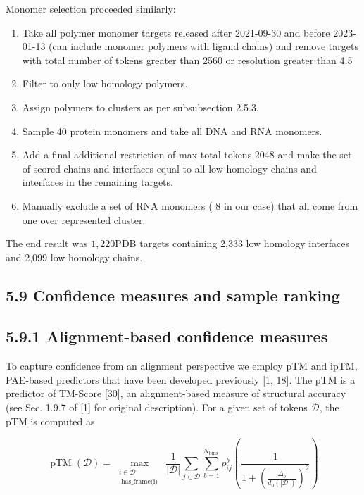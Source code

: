 \documentclass[10pt]{article}
\begin{document}
Monomer selection proceeded similarly:

\begin{enumerate}
  \item Take all polymer monomer targets released after 2021-09-30 and before 2023-01-13 (can include monomer polymers with ligand chains) and remove targets with total number of tokens greater than 2560 or resolution greater than 4.5
  \item Filter to only low homology polymers.
  \item Assign polymers to clusters as per subsubsection 2.5.3.
  \item Sample 40 protein monomers and take all DNA and RNA monomers.
  \item Add a final additional restriction of max total tokens 2048 and make the set of scored chains and interfaces equal to all low homology chains and interfaces in the remaining targets.
  \item Manually exclude a set of RNA monomers ( 8 in our case) that all come from one over represented cluster.
\end{enumerate}

The end result was $1,220 \mathrm{PDB}$ targets containing 2,333 low homology interfaces and 2,099 low homology chains.

\subsection*{5.9 Confidence measures and sample ranking}
\subsection*{5.9.1 Alignment-based confidence measures}
To capture confidence from an alignment perspective we employ pTM and ipTM, PAE-based predictors that have been developed previously [1, 18]. The pTM is a predictor of TM-Score [30], an alignment-based measure of structural accuracy (see Sec. 1.9.7 of [1] for original description). For a given set of tokens $\mathcal{D}$, the pTM is computed as


\begin{equation*}
\operatorname{pTM}(\mathcal{D})=\max _{\substack{i \in \mathcal{D} \\ \text { has_frame(i) }}} \frac{1}{|\mathcal{D}|} \sum_{j \in \mathcal{D}} \sum_{b=1}^{N_{\text {bins }}} p_{i j}^{b}\left(\frac{1}{1+\left(\frac{\Delta_{b}}{d_{0}(|\mathcal{D}|)}\right)^{2}}\right) \tag{17}
\end{equation*}
\end{document}
